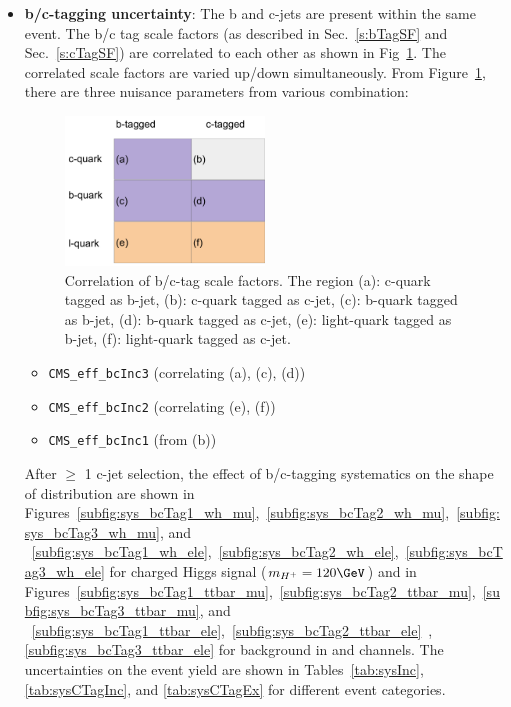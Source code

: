 \begin{itemize}
    \item {\bf b/c-tagging uncertainty}: The b and c-jets are present within the same event. 
    The b/c tag scale factors (as described in Sec.~\ref{s:bTagSF} and Sec.~\ref{s:cTagSF}) 
    are correlated to each other as shown in Fig~\ref{fig:bcCorr}. 
    The correlated scale factors are varied up/down simultaneously. From Figure~\ref{fig:bcCorr}, 
    there are three nuisance parameters from various combination:
    \begin{figure}
    \begin{center}
    \includegraphics[width=0.50\textwidth]{Image/bcCorrelation.pdf}
    \caption{Correlation of b/c-tag scale factors. The region (a): c-quark tagged as b-jet, 
        (b): c-quark tagged as c-jet, (c): b-quark tagged as b-jet, (d): b-quark tagged as c-jet, 
        (e): light-quark tagged as b-jet, (f): light-quark tagged as c-jet.}
    \label{fig:bcCorr}
    \end{center}
    \end{figure}
    \begin{itemize}
    \item \verb|CMS_eff_bcInc3| (correlating (a), (c), (d))
    \item \verb|CMS_eff_bcInc2| (correlating (e), (f))
    \item \verb|CMS_eff_bcInc1| (from (b))
    \end{itemize}
    After $\geq$ 1 c-jet selection, the effect of b/c-tagging systematics on the shape of \mjj distribution are shown in    
    Figures~\ref{subfig:sys_bcTag1_wh_mu},~\ref{subfig:sys_bcTag2_wh_mu},~\ref{subfig:sys_bcTag3_wh_mu},
    and ~\ref{subfig:sys_bcTag1_wh_ele},~\ref{subfig:sys_bcTag2_wh_ele},~\ref{subfig:sys_bcTag3_wh_ele}
    for charged Higgs signal ($m_{H^+} = 120 \GeV$) and in
    Figures~\ref{subfig:sys_bcTag1_ttbar_mu},~\ref{subfig:sys_bcTag2_ttbar_mu},~\ref{subfig:sys_bcTag3_ttbar_mu},
    and
    ~\ref{subfig:sys_bcTag1_ttbar_ele},~\ref{subfig:sys_bcTag2_ttbar_ele}~,\ref{subfig:sys_bcTag3_ttbar_ele}
    for \ttjets background in \mujets and \ejets channels.
    The uncertainties on the event yield are shown in 
    Tables~\ref{tab:sysInc}, \ref{tab:sysCTagInc}, and \ref{tab:sysCTagEx} for different event categories.                                 


\end{itemize}
